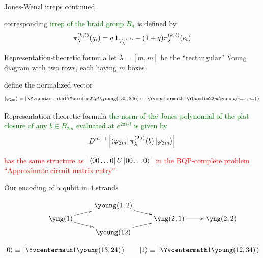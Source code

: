 \documentclass{prosper}
\renewcommand{\>}{\rangle}
\newcommand{\<}{\langle}
\begin{document}
\begin{slide}{Jones-Wenzl irreps continued}

corresponding \textcolor{green}{irrep of the braid group $B_n$} is
defined by
\[
\pi_\lambda^{(k,\ell)}(g_i) =
q\, {\bf 1}_{V_\lambda^{(k,l)}} -(1+q) \pi_\lambda^{(k,\ell)}(e_i)
\]
\end{slide}


\begin{slide}{Representation-theoretic formula} 
let $\lambda=[m,m]$ be the ``rectangular'' Young diagram with two
rows, each having $m$ boxes

\newcommand{\nnn}{\mbox{\tiny $2m\!\!-\!\!1$}}
\newcommand{\nnnn}{\mbox{\tiny $2m$}}

\medskip
define the normalized vector
\[
\ket{\varphi_{2m}} = \ket{\,
{\Yvcentermath1\Yboxdim22pt\young(135,246)}\cdots
{\Yvcentermath1\Yboxdim22pt\young(\nnn,\nnnn)}\,}
\]
\end{slide}

\begin{slide}{Representation-theoretic formula}
\textcolor{green}{the norm of the Jones polynomial of the plat
closure of any $b\in B_{2m}$ evaluated at $e^{2\pi i /l}$ is given by}
\[D^{m-1}
\left|
\left\langle{\varphi_{2m}}\right\vert \pi_\lambda^{(2,l)}(b) \left\vert{\varphi_{2m}}\right\rangle
\right|
\]

\medskip
\textcolor{red}{has the same structure as $|\left\langle{00\ldots 0}\right\vert U
\left\vert{00\ldots 0}\right\rangle|$ in the BQP-complete problem ``Approximate circuit
matrix entry''} 
\end{slide}



\begin{slide}{Our encoding of a qubit in $4$ strands}

\[
\xymatrix@R=.1cm{
& & {\young(1,2)} \ar[rd] \\
 & {\yng(1)} \ar[ur] \ar[dr] & & {\yng(2,1)} \ar[r] & 
{\yng(2,2)} \\
& & {\young(12)} \ar[ru]
}
\]

\medskip
\[
\ket{0} \equiv \ket{\, \Yvcentermath1 \young(13,24)\,}  \quad\quad
\ket{1} \equiv \ket{\, \Yvcentermath1 \young(12,34)\,}
\]

\end{slide}
\end{document}
